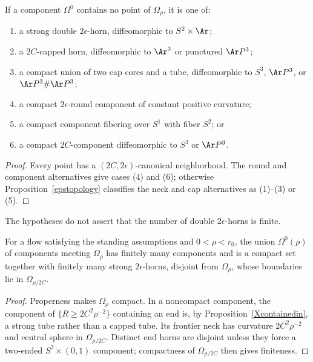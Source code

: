 \begin{lemma}
\label{lem:omega-component-classification}
If a component $\Omega^0$ contains no point of $\Omega_\rho$, it is one of:
\begin{enumerate}
\item a strong double $2\epsilon$-horn, diffeomorphic to $S^2\times\Ar$;
\item a $2C$-capped horn, diffeomorphic to $\Ar^3$ or punctured $\Ar P^3$;
\item a compact union of two cap cores and a tube, diffeomorphic to
$S^3$, $\Ar P^3$, or $\Ar P^3\#\Ar P^3$;
\item a compact $2\epsilon$-round component of constant positive curvature;
\item a compact component fibering over $S^1$ with fiber $S^2$; or
\item a compact $2C$-component diffeomorphic to $S^3$ or $\Ar P^3$.
\end{enumerate}
\end{lemma}
\begin{proof}\sketch Every
point has a $(2C,2\epsilon)$-canonical neighborhood. The round and component
alternatives give cases (4) and (6); otherwise Proposition~\ref{epstopology}
classifies the neck and cap alternatives as (1)--(3) or (5).\end{proof}
\begin{remark}
\label{rem:possibly-infinitely-many-horns}
The hypotheses do not assert that the number of double $2\epsilon$-horns is finite.
\end{remark}

\begin{lemma}
\label{lem:finitely-many-horns-meeting-omega-rho}\label{2epshorns}
For a flow satisfying the standing assumptions and $0<\rho<r_0$, the union
$\Omega^0(\rho)$ of components meeting $\Omega_\rho$ has finitely many
components and is a compact set together with finitely many strong
$2\epsilon$-horns, disjoint from $\Omega_\rho$, whose boundaries lie in
$\Omega_{\rho/2C}$.
\end{lemma}
\begin{proof}
\sketch Properness makes $\Omega_\rho$ compact. In a noncompact component,
the component of $\{R\ge2C^2\rho^{-2}\}$ containing an end is, by
Proposition~\ref{Xcontainedin}, a strong tube rather than a capped tube.
Its frontier neck has curvature $2C^2\rho^{-2}$ and central sphere in
$\Omega_{\rho/2C}$. Distinct end horns are disjoint unless they force a
two-ended $S^2\times(0,1)$ component; compactness of
$\Omega_{\rho/2C}$ then gives finiteness.\end{proof}

